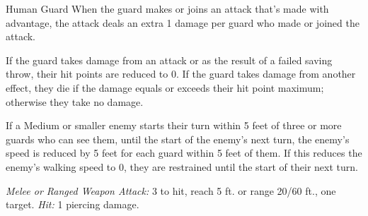\documentclass[10pt,a4paper,twoside,bg=print,twocolumn,openany,nodeprecatedcode]{dndbook}
\begin{document}
\begin{DndMonster}[float=t]{Human Guard}
\DndMonsterBasics[
armor-class = {16 (\textit{chain shirt})},
hit-points = {\DndDice{5}},
speed = {30 ft.}
]
\DndMonsterAbilityScores[
 str = 12,
 dex = 12,
 con = 12,
 int = 10,
 wis = 10,
 cha = 10
]
\DndMonsterDetails[
skills = {Perception +2},
languages = {Common},
challenge = 1/8,
]
When the guard makes or joins an attack that's made with advantage, the attack deals an extra 1 damage per guard who made or joined the attack.

If the guard takes damage from an attack or as the result of a failed saving throw, their hit points are reduced to 0. If the guard takes damage from another effect, they die if the damage equals or exceeds their hit point maximum; otherwise they take no damage.

If a Medium or smaller enemy starts their turn within 5 feet of three or more guards who can see them, until the start of the enemy's next turn, the enemy's speed is reduced by 5 feet for each guard within 5 feet of them. If this reduces the enemy's walking speed to 0, they are restrained until the start of their next turn.

\textsl{Melee or Ranged Weapon Attack:} 3 to hit, reach 5 ft. or range 20/60 ft., one target. \textsl{Hit:} 1 piercing damage.

\end{DndMonster}
\end{document}
